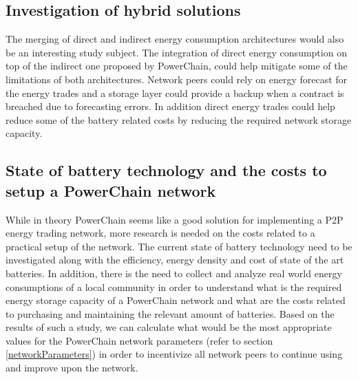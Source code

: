 \subsection*{Investigation of hybrid solutions}
The merging of direct and indirect energy consumption architectures would also be an interesting study subject. The integration of direct energy consumption on top of the indirect one proposed by PowerChain,
could help mitigate some of the limitations of both architectures. Network peers could rely on energy forecast for the energy trades and a storage layer could provide a backup when a contract is breached due to
forecasting errors. In addition direct energy trades could help reduce some of the battery related costs by reducing the required network storage capacity.
\subsection*{State of battery technology and the costs to setup a PowerChain network}
While in theory PowerChain seems like a good solution for implementing a P2P energy trading network, more research is needed on the costs related to a practical setup of the network. The current state of battery technology
need to be investigated along with the efficiency, energy density and cost of state of the art batteries. In addition, there is the need to collect and analyze real world energy consumptions of a local community in order to
understand what is the required energy storage capacity of a PowerChain network and what are the costs related to purchasing and maintaining the relevant amount of batteries. Based on the results of such a study, we can
calculate what would be the most appropriate values for the PowerChain network parameters (refer to section \ref{networkParameters}) in order to incentivize all network peers to continue using and improve upon the network.
